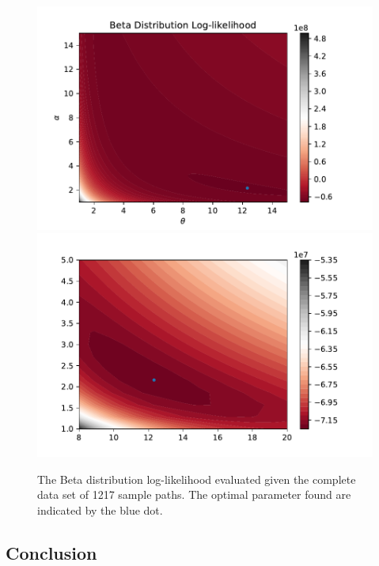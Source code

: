 \documentclass[10pt,twocolumn,letterpaper]{article}
\begin{document}
\begin{figure}[t]
\begin{center}
   \includegraphics[width=0.9\linewidth]{ISO_lines_detailed.pdf}
   \includegraphics[width=0.9\linewidth]{ISO_lines_zoom_2.pdf}
\end{center}
   \caption{The Beta distribution log-likelihood evaluated given the complete data set of 1217 sample paths. The optimal parameter found are indicated by the blue dot.}
\label{fig:ISO}
\end{figure}





 
 
 




\subsection{Conclusion}
\end{document}
